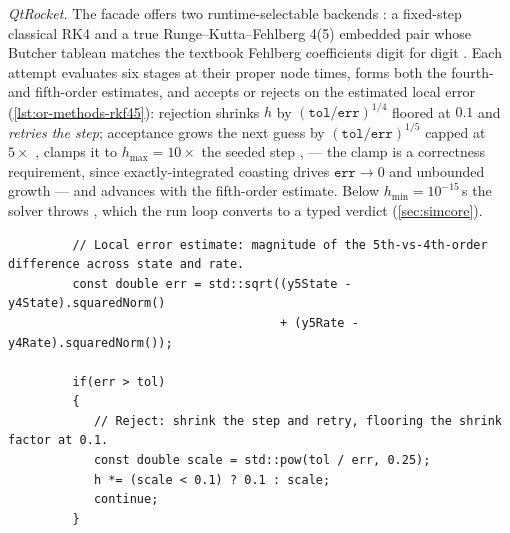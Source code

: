 \emph{QtRocket.} The  facade offers two runtime-selectable backends
: a fixed-step classical RK4  and a true
Runge--Kutta--Fehlberg 4(5) embedded pair whose Butcher tableau matches the textbook
Fehlberg coefficients digit for digit . Each attempt evaluates
six stages at their proper node times, forms both the fourth- and fifth-order estimates, and
accepts or rejects on the estimated local error (\cref{lst:or-methods-rkf45}): rejection
shrinks $h$ by $(\mathtt{tol}/\mathtt{err})^{1/4}$ floored at $0.1$ and \emph{retries the
step}; acceptance grows the next guess by $(\mathtt{tol}/\mathtt{err})^{1/5}$ capped at
$5\times$ , clamps it to $h_{\max} = 10\times$ the seeded step
,  --- the clamp is a correctness
requirement, since exactly-integrated coasting drives $\mathtt{err}\to 0$ and unbounded
growth --- and advances with the fifth-order estimate. Below
$h_{\min} = 10^{-15}$\,s the solver throws , which the run loop
converts to a typed  verdict 
(\cref{sec:simcore}).

\begin{listing}[htbp]
\begin{verbatim}
         // Local error estimate: magnitude of the 5th-vs-4th-order difference across state and rate.
         const double err = std::sqrt((y5State - y4State).squaredNorm()
                                      + (y5Rate - y4Rate).squaredNorm());

         if(err > tol)
         {
            // Reject: shrink the step and retry, flooring the shrink factor at 0.1.
            const double scale = std::pow(tol / err, 0.25);
            h *= (scale < 0.1) ? 0.1 : scale;
            continue;
         }
\end{verbatim}
\caption{The step-rejection core OpenRocket's ascent stepper has no analogue of: an
embedded-pair error estimate compared against a tolerance, with the step retried when it
fails. }
\label{lst:or-methods-rkf45}
\end{listing}

